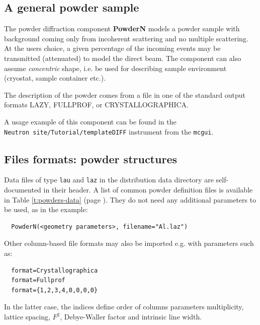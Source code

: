 \subsection*{A general powder sample}
\label{powder}


The powder diffraction component \textbf{PowderN} models a powder sample
with background coming only from incoherent scattering and no
multiple scattering. At the users choice, a given percentage of the incoming
events may be transmitted (attenuated) to model the direct beam. The component can also
assume \emph{concentric} shape, i.e. be used for describing sample environment (cryostat,
sample container etc.). 

The description of the powder comes from a file in one of the standard output formats LAZY, FULLPROF, or CRYSTALLOGRAPHICA.

A usage example of this component can be found in the \\
\verb+Neutron site/Tutorial/templateDIFF+ instrument from the \verb+mcgui+.

\subsection{Files formats: powder structures}

Data files of type \verb'lau' and \verb'laz' in the \MCS distribution data directory are self-documented in their header. A list of common powder definition files is available in Table \ref{t:powders-data} (page \pageref{t:powders-data}). They do not need any additional parameters to be used, as in the example:
\begin{lstlisting}
  PowderN(<geometry parameters>, filename="Al.laz")
\end{lstlisting}
Other column-based file formats may also be imported e.g. with parameters such as:
\begin{lstlisting}
  format=Crystallographica
  format=Fullprof
  format={1,2,3,4,0,0,0,0}
\end{lstlisting}
In the latter case, the indices define order of columns parameters
multiplicity, lattice spacing, $F^2$, Debye-Waller factor and intrinsic line width.

